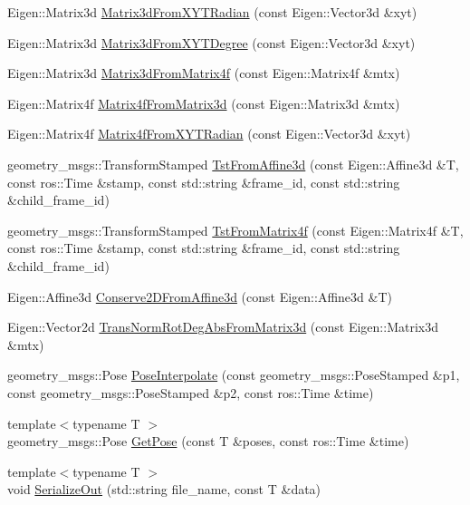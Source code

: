 \begin{DoxyCompactItemize}
Eigen\+::\+Matrix3d \hyperlink{namespacecommon_a79c5532f7b71e03e4436194f78e637ce}{Matrix3d\+From\+X\+Y\+T\+Radian} (const Eigen\+::\+Vector3d \&xyt)
\item 
Eigen\+::\+Matrix3d \hyperlink{namespacecommon_abd161a56797ce1d90331acbf3d441d90}{Matrix3d\+From\+X\+Y\+T\+Degree} (const Eigen\+::\+Vector3d \&xyt)
\item 
Eigen\+::\+Matrix3d \hyperlink{namespacecommon_a12010389a8f6bfb72230dbe65eb60ff2}{Matrix3d\+From\+Matrix4f} (const Eigen\+::\+Matrix4f \&mtx)
\item 
Eigen\+::\+Matrix4f \hyperlink{namespacecommon_a95c001ee532d4d5659496a2f3699e3d7}{Matrix4f\+From\+Matrix3d} (const Eigen\+::\+Matrix3d \&mtx)
\item 
Eigen\+::\+Matrix4f \hyperlink{namespacecommon_a43b57f5e12ace94174d0110531826896}{Matrix4f\+From\+X\+Y\+T\+Radian} (const Eigen\+::\+Vector3d \&xyt)
\item 
geometry\+\_\+msgs\+::\+Transform\+Stamped \hyperlink{namespacecommon_af406e07c4c8640ce9b10a2ff45365ae1}{Tst\+From\+Affine3d} (const Eigen\+::\+Affine3d \&T, const ros\+::\+Time \&stamp, const std\+::string \&frame\+\_\+id, const std\+::string \&child\+\_\+frame\+\_\+id)
\item 
geometry\+\_\+msgs\+::\+Transform\+Stamped \hyperlink{namespacecommon_a3e57252779375868d389d7c9f943a44f}{Tst\+From\+Matrix4f} (const Eigen\+::\+Matrix4f \&T, const ros\+::\+Time \&stamp, const std\+::string \&frame\+\_\+id, const std\+::string \&child\+\_\+frame\+\_\+id)
\item 
Eigen\+::\+Affine3d \hyperlink{namespacecommon_ac1ecd24c73d1ded5d44eee957aa24b6d}{Conserve2\+D\+From\+Affine3d} (const Eigen\+::\+Affine3d \&T)
\item 
Eigen\+::\+Vector2d \hyperlink{namespacecommon_a191afad1f06d091167c390fbe1457b5d}{Trans\+Norm\+Rot\+Deg\+Abs\+From\+Matrix3d} (const Eigen\+::\+Matrix3d \&mtx)
\item 
geometry\+\_\+msgs\+::\+Pose \hyperlink{namespacecommon_a31d70b6febb50afde5fa00fc9a310fe3}{Pose\+Interpolate} (const geometry\+\_\+msgs\+::\+Pose\+Stamped \&p1, const geometry\+\_\+msgs\+::\+Pose\+Stamped \&p2, const ros\+::\+Time \&time)
\item 
{\footnotesize template$<$typename T $>$ }\\geometry\+\_\+msgs\+::\+Pose \hyperlink{namespacecommon_afec20fc02d4e0364825bb7f9dbca7bfc}{Get\+Pose} (const T \&poses, const ros\+::\+Time \&time)
\item 
{\footnotesize template$<$typename T $>$ }\\void \hyperlink{namespacecommon_adac07f1443b546753894f4466ae7d051}{Serialize\+Out} (std\+::string file\+\_\+name, const T \&data)

\end{DoxyCompactItemize}

